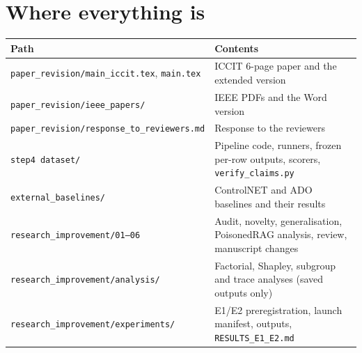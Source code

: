 \documentclass[11pt,a4paper]{article}
\begin{document}
\section{Where everything is}

\begin{table}[h]
\centering\small
\begin{tabularx}{\linewidth}{@{}l Y@{}}
\toprule
Path & Contents \\
\midrule
\texttt{paper\_revision/main\_iccit.tex}, \texttt{main.tex} & ICCIT 6-page paper and the extended version \\
\texttt{paper\_revision/ieee\_papers/} & IEEE PDFs and the Word version \\
\texttt{paper\_revision/response\_to\_reviewers.md} & Response to the reviewers \\
\texttt{step4 dataset/} & Pipeline code, runners, frozen per-row outputs, scorers, \texttt{verify\_claims.py} \\
\texttt{external\_baselines/} & ControlNET and ADO baselines and their results \\
\texttt{research\_improvement/01--06} & Audit, novelty, generalisation, PoisonedRAG analysis, review, manuscript changes \\
\texttt{research\_improvement/analysis/} & Factorial, Shapley, subgroup and trace analyses (saved outputs only) \\
\texttt{research\_improvement/experiments/} & E1/E2 preregistration, launch manifest, outputs, \texttt{RESULTS\_E1\_E2.md} \\
\bottomrule
\end{tabularx}
\end{table}
\end{document}
